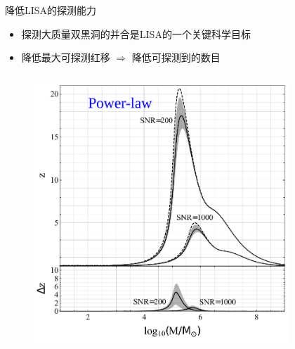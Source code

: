 \documentclass[xcolor={svgnames},compress]{beamer}
\let\olditem\item
\renewcommand{\item}{%
    \olditem\vspace{\fill}}
\begin{document}
\begin{frame}{降低LISA的探测能力}
    \vspace{-2mm}
    \begin{itemize}
        \item 探测大质量双黑洞的并合是LISA的一个关键科学目标
        \item 降低最大可探测红移 $\Rightarrow$ 降低可探测到的数目
    \end{itemize}
    \vspace{-2mm}
    \begin{columns}
        \begin{column}{0.54\textwidth} 
            \begin{figure}[htbp!]
                \centering
                \includegraphics[width = \textwidth]{./pic/z-PBH-power01.pdf}
            \end{figure}
        \end{column}
        \begin{column}{0.54\textwidth} 
            \begin{figure}[htbp!]
                \centering

\end{figure}
\end{column}
\end{columns}
\end{frame}
\end{document}
